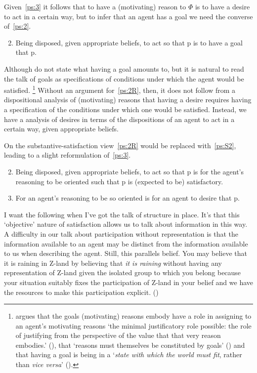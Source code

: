 \documentclass[10pt]{article}
\begin{document}
Given~\ref{ps:3} it follows that to have a (motivating) reason to \(\Phi\) is to have a desire to act in a certain way, but to infer that an agent has a goal we need the converse of~\ref{ps:2}.
\begin{enumerate}[label=\arabic*\('\)., ref=(\arabic*\('\))]\setcounter{enumi}{1}
\item\label{ps:2R} Being disposed, given appropriate beliefs, to act so that p is to have a goal that p.
\end{enumerate}
Although \citeauthor{Pettit:1990aa} do not state what having a goal amounts to, but it is natural to read the talk of goals as specifications of conditions under which the agent would be satisfied.\nolinebreak
\footnote{
  \citeauthor{Smith:1987aa} argues that the goals (motivating) reasons embody have a role in assigning to an agent's motivating reasons `the minimal justificatory role possible: the role of justifying from the perspective of the value that that very reason embodies.'  (\citeyear[38--39]{Smith:1987aa}), that `reasons must themselves be constituted by goals' (\citeyear[45]{Smith:1987aa}) and that having a goal is being in a `\emph{state with which the world must fit}, rather than \emph{vice versa}' (\citeyear[54]{Smith:1987aa}).
}
Without an argument for~\ref{ps:2R}, then, it does not follow from a dispositional analysis of (motivating) reasons that having a desire requires having a specification of the conditions under which one would be satisfied.
Instead, we have a analysis of desires in terms of the dispositions of an agent to act in a certain way, given appropriate beliefs.

On the substantive-satisfaction view~\ref{ps:2R} would be replaced with~\ref{ps:S2}, leading to a slight reformulation of~\ref{ps:3}.
\begin{enumerate}[label=\arabic*\(''\)., ref=(\arabic*\(''\))]\setcounter{enumi}{1}
\item\label{ps:S2} Being disposed, given appropriate beliefs, to act so that p is for the agent's reasoning to be oriented such that p is (expected to be) satisfactory.
\item\label{ps:S3} For an agent's reasoning to be so oriented is for an agent to desire that p.
\end{enumerate}









{\color{red}
  I want the following when I've got the talk of structure in place.
  It's that this `objective' nature of satisfaction allows us to talk about information in this way.
}
A difficulty in our talk about participation without representation is that the information available to an agent may be distinct from the information available to us when describing the agent.
Still, this parallels belief.
You may believe that it is raining in Z-land by believing that \emph{it is raining} without having any representation of Z-land given the isolated group to which you belong because your situation suitably fixes the participation of Z-land in your belief and we have the resources to make this participation explicit.
(\cite[cf.][]{Perry:1986aa})
\end{document}
